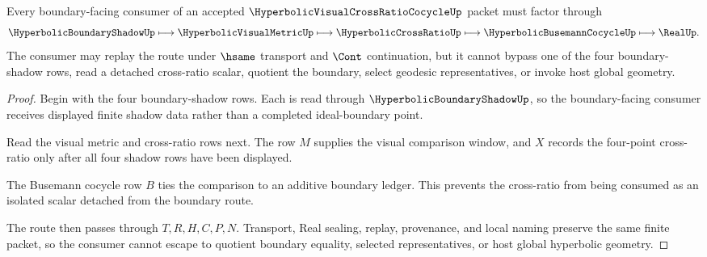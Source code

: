 \begin{theorem}
\label{thm:hyperbolic-visual-cross-ratio-cocycle-boundary-handoff}
Every boundary-facing consumer of an accepted $\HyperbolicVisualCrossRatioCocycleUp$ packet must factor through
$$
\HyperbolicBoundaryShadowUp
\longmapsto
\HyperbolicVisualMetricUp
\longmapsto
\HyperbolicCrossRatioUp
\longmapsto
\HyperbolicBusemannCocycleUp
\longmapsto
\RealUp .
$$
The consumer may replay the route under $\hsame$ transport and $\Cont$ continuation, but it cannot bypass one of the four boundary-shadow rows, read a detached cross-ratio scalar, quotient the boundary, select geodesic representatives, or invoke host global geometry.
\end{theorem}
\begin{proof}
Begin with the four boundary-shadow rows. Each is read through $\HyperbolicBoundaryShadowUp$, so the boundary-facing consumer receives displayed finite shadow data rather than a completed ideal-boundary point.

Read the visual metric and cross-ratio rows next. The row $M$ supplies the visual comparison window, and $X$ records the four-point cross-ratio only after all four shadow rows have been displayed.

The Busemann cocycle row $B$ ties the comparison to an additive boundary ledger. This prevents the cross-ratio from being consumed as an isolated scalar detached from the boundary route.

The route then passes through $T,R,H,C,P,N$. Transport, Real sealing, replay, provenance, and local naming preserve the same finite packet, so the consumer cannot escape to quotient boundary equality, selected representatives, or host global hyperbolic geometry.
\end{proof}



